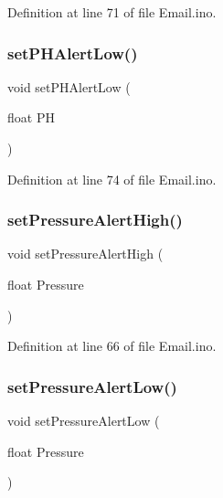 Definition at line 71 of file Email.\+ino.

\mbox{\label{_email_8ino_a91fa20dc7c663d88fb44cd853fa01ecf}} 
\subsubsection{\texorpdfstring{setPHAlertLow()}{setPHAlertLow()}}
{\footnotesize\ttfamily void set\+P\+H\+Alert\+Low (\begin{DoxyParamCaption}\item[{float}]{PH }\end{DoxyParamCaption})}



Definition at line 74 of file Email.\+ino.

\mbox{\label{_email_8ino_acdb71d0d46a3d2040c2d4ee6410bce3a}} 
\subsubsection{\texorpdfstring{setPressureAlertHigh()}{setPressureAlertHigh()}}
{\footnotesize\ttfamily void set\+Pressure\+Alert\+High (\begin{DoxyParamCaption}\item[{float}]{Pressure }\end{DoxyParamCaption})}



Definition at line 66 of file Email.\+ino.

\mbox{\label{_email_8ino_ac1a880d7c1a884a7852d684a8d37b0d4}} 
\subsubsection{\texorpdfstring{setPressureAlertLow()}{setPressureAlertLow()}}
{\footnotesize\ttfamily void set\+Pressure\+Alert\+Low (\begin{DoxyParamCaption}\item[{float}]{Pressure }\end{DoxyParamCaption})}



